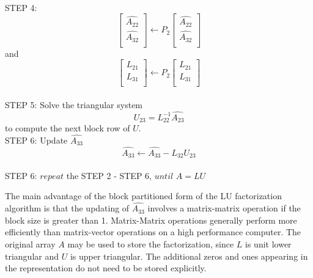 \\
STEP 4:
\begin{equation}
\left[\begin{array}{l}  
 \hat{A_{22}}\\ 
 \hat{A_{32}}\\  
\end{array}\right] \leftarrow
P_{2}  
\left[\begin{array}{l}  
 \hat{A_{22}}\\ 
 \hat{A_{32}}\\  
\end{array}\right]
\end{equation}
and 
\begin{equation}
\left[\begin{array}{l}
L_{21}\\
L_{31}\\
\end{array}\right] \leftarrow
P_{2}
\left[\begin{array}{l}
L_{21}\\
L_{31}\\
\end{array}\right]
\end{equation}\\
STEP 5:
Solve the triangular system
\begin{equation}
U_{23} = L_{22}^{-1}\hat{A_{23}}
\end{equation}
to compute the next block row of $U$. 
\\
STEP 6: Update $\hat{A_{33}}$
\begin{equation}
\hat{A_{33}} \leftarrow \hat{A_{33}} - L_{32}U_{23}
\end{equation}\\
STEP 6: $repeat$ the STEP 2 - STEP 6, $until$ $A=LU$

The main advantage of the block partitioned form of the LU factorization algorithm is that the updating of $\hat{A_{33}}$ involves a matrix-matrix operation if
the block size is greater than 1. Matrix-Matrix operations generally perform more efficiently than matrix-vector operations on a high performance computer. The
original array $A$ may be used to store the factorization, since $L$ is unit lower triangular and $U$ is upper triangular. The additional zeros and
ones appearing in the representation do not need to be stored explicitly.

